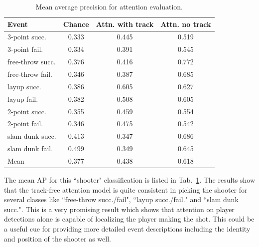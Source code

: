\begin{table}[ht!]
\begin{center}
\small
 \begin{tabular}{|l|c|c|c|}
  \hline
Event            & Chance & Attn. with track & Attn. no track \\ \hline \hline
3-point succ.    & 0.333 & 0.445 & 0.519 \\ 
3-point fail.    & 0.334 & 0.391 & 0.545 \\ 
free-throw succ. & 0.376 & 0.416 & 0.772 \\ 
free-throw fail. & 0.346 & 0.387 & 0.685 \\  
layup succ.      & 0.386 & 0.605 & 0.627 \\ 
layup fail.      & 0.382 & 0.508 & 0.605 \\ 
2-point succ.    & 0.355 & 0.459 & 0.554 \\ 
2-point fail.    & 0.346 & 0.475 & 0.542 \\ 
slam dunk succ.  & 0.413 & 0.347 & 0.686 \\ 
slam dunk fail.  & 0.499 & 0.349 & 0.645 \\ \hline \hline  
Mean             & 0.377 & 0.438 & 0.618 \\ \hline
  \end{tabular}
\end{center}
  \caption{Mean average precision for attention evaluation.}
  \vspace{-4mm}
  \label{tab:attention_res}
\end{table}


The mean AP for this ``shooter"  classification is listed in
Tab.~\ref{tab:attention_res}.  The results show that the track-free attention
model is quite consistent in picking the shooter for several classes like
``free-throw succ./fail", ``layup succ./fail." and ``slam dunk succ.". This is
a very promising result which shows that attention on player detections alone
is capable of localizing the player making the shot. This could be a useful cue
for providing more detailed event descriptions including the identity and
position of the shooter as well.

